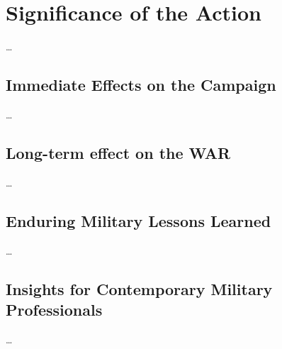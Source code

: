 \section{Significance of the Action}

\ldots

\subsection{Immediate Effects on the Campaign}

\ldots

\subsection{Long-term effect on the WAR}

\ldots

\subsection{Enduring Military Lessons Learned}

\ldots

\subsection{Insights for Contemporary Military Professionals}

\ldots

